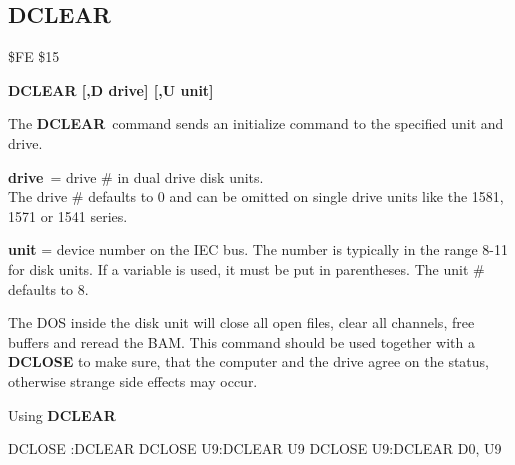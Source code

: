 
\newpage
\subsection{DCLEAR}
\begin{description}[leftmargin=3cm,style=nextline]
\item [Token:] \$FE \$15
\item [Format:] {\bf DCLEAR [,D drive] [,U unit] }
\item [Usage:]
   The {\bf DCLEAR} command sends an initialize command to
   the specified unit and drive.

   {\bf drive} = drive \# in dual drive disk units. \\
   The drive \# defaults to 0 and can be omitted on single drive units
   like the 1581, 1571 or 1541 series.

   {\bf unit} = device number on the IEC bus.
   The number is typically in the range 8-11 for disk units.
   If a variable is used, it must be put in parentheses.
   The unit \# defaults to 8.

\item [Remarks:]
   The DOS inside the disk unit will close all open files,
   clear all channels, free buffers and reread the BAM.
   This command should be used together with a {\bf DCLOSE}
   to make sure, that the computer and the drive agree
   on the status, otherwise strange side effects may occur.

\item [Example:] Using {\bf DCLEAR}
\begin{screenoutput}
  DCLOSE   :DCLEAR
  DCLOSE U9:DCLEAR U9
  DCLOSE U9:DCLEAR D0, U9
\end{screenoutput}
\end{description}


\newpage

